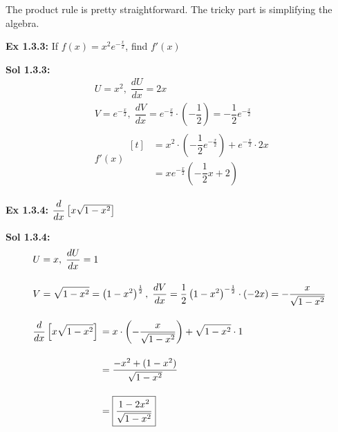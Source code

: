 The product rule is pretty straightforward. The tricky part is simplifying the algebra. \par

\begin{tcolorbox}[example]
    \textbf{Ex 1.3.3: } If $f(x) = x^2e^{-\frac{x}{2}}$, find $f'(x)$ 
\end{tcolorbox}
\begin{tcolorbox}[solution]
    \textbf{Sol 1.3.3: } \begin{align*}
        & U = x^2, \; \dfrac{dU}{dx} = 2x \\[11pt]
        & V = e^{-\frac{x}{2}}, \; \dfrac{dV}{dx} = e^{-\frac{x}{2}} \cdot \left(-\dfrac{1}{2}\right) = -\dfrac{1}{2}e^{-\frac{x}{2}} \\[11pt]
        & f'(x) \begin{aligned}[t]
            & = x^2 \cdot \left(-\dfrac{1}{2}e^{-\frac{x}{2}}\right) + e^{-\frac{x}{2}} \cdot 2x \\[11pt]
            & = \boxed{xe^{-\frac{x}{2}}\left(-\dfrac{1}{2}x + 2\right)}
        \end{aligned}
    \end{align*}
\end{tcolorbox} \vspace{11pt}

\begin{tcolorbox}[example]
    \textbf{Ex 1.3.4: } $\dfrac{d}{dx} \left[x\sqrt{1 - x^2}\right]$ 
\end{tcolorbox}
\begin{tcolorbox}[solution]
    \textbf{Sol 1.3.4: } \begin{align*}
        & U = x, \; \dfrac{dU}{dx} = 1 \\[11pt]
        & V = \sqrt{1 - x^2} = \left(1 - x^2\right)^\frac{1}{2}, \; \dfrac{dV}{dx} = \dfrac{1}{2}\left(1 - x^2\right)^{-\frac{1}{2}} \cdot (-2x) = -\dfrac{x}{\sqrt{1 - x^2}} \\[11pt]
        & \dfrac{d}{dx} \left[x\sqrt{1 - x^2}\right] \begin{aligned}[t]
            & = x \cdot \left(-\dfrac{x}{\sqrt{1 - x^2}}\right) + \sqrt{1 - x^2} \cdot 1 \\[11pt]
            & = \dfrac{-x^2 + (1 - x^2)}{\sqrt{1 - x^2}} \\[11pt]
            & = \boxed{\dfrac{1 - 2x^2}{\sqrt{1 - x^2}}}
        \end{aligned}
    \end{align*}
\end{tcolorbox} \vspace{11pt}

